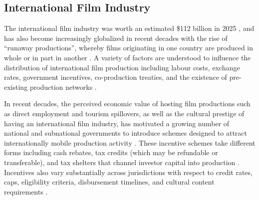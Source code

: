 %
%
%

\subsection{International Film Industry}
\label{sec:film_industry}

The international film industry was worth an estimated \$112 billion in 2025 \citep{grandview2026}, and has also become increasingly globalized in recent decades with the rise of ``runaway productions'', whereby films originating in one country are produced in whole or in part in another \citep{morawetz2007}. A variety of factors are understood to influence the distribution of international film production including labour costs, exchange rates, government incentives, co-production treaties, and the existence of pre-existing production networks \citep{christopherson1987, morawetz2007, owens2020, button2019, mitric2018}.

In recent decades, the perceived economic value of hosting film productions such as direct employment and tourism spillovers, as well as the cultural prestige of having an international film industry, has motivated a growing number of national and subnational governments to introduce schemes designed to attract internationally mobile production activity \citep{christopherson2010}. These incentive schemes take different forms including cash rebates, tax credits (which may be refundable or transferable), and tax shelters that channel investor capital into production \citep{button2019, olsberg2025}. Incentives also vary substantially across jurisdictions with respect to credit rates, caps, eligibility criteria, disbursement timelines, and cultural content requirements \citep{olsberg2025}.

